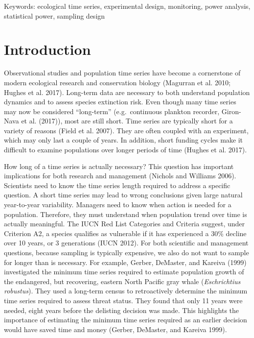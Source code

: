 \documentclass[12pt,]{article}
\begin{document}
Keywords: ecological time series, experimental design, monitoring, power
analysis, statistical power, sampling design

\section{Introduction}\label{introduction}

Observational studies and population time series have become a
cornerstone of modern ecological research and conservation biology
(Magurran et al. 2010; Hughes et al. 2017). Long-term data are necessary
to both understand population dynamics and to assess species extinction
risk. Even though many time series may now be considered ``long-term''
(e.g.~continuous plankton recorder, Giron-Nava et al. (2017)), most are
still short. Time series are typically short for a variety of reasons
(Field et al. 2007). They are often coupled with an experiment, which
may only last a couple of years. In addition, short funding cycles make
it difficult to examine populations over longer periods of time (Hughes
et al. 2017).

How long of a time series is actually necessary? This question has
important implications for both research and management (Nichols and
Williams 2006). Scientists need to know the time series length required
to address a specific question. A short time series may lead to wrong
conclusions given large natural year-to-year variability. Managers need
to know when action is needed for a population. Therefore, they must
understand when population trend over time is actually meaningful. The
IUCN Red List Categories and Criteria suggest, under Criterion A2, a
species qualifies as vulnerable if it has experienced a 30\% decline
over 10 years, or 3 generations (IUCN 2012). For both scientific and
management questions, because sampling is typically expensive, we also
do not want to sample for longer than is necessary. For example, Gerber,
DeMaster, and Kareiva (1999) investigated the minimum time series
required to estimate population growth of the endangered, but
recovering, eastern North Pacific gray whale
(\emph{Eschrichtius robustus}). They used a long-term census to
retroactively determine the minimum time series required to assess
threat status. They found that only 11 years were needed, eight years
before the delisting decision was made. This highlights the importance
of estimating the minimum time series required as an earlier decision
would have saved time and money (Gerber, DeMaster, and Kareiva 1999).
\end{document}
